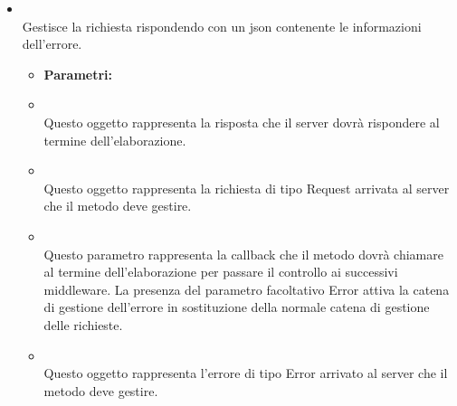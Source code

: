 \begin{itemize}
\item[] \textbf{} \\ Gestisce la richiesta rispondendo con un json contenente le informazioni dell'errore.
\begin{itemize}\addtolength{\itemsep}{-0.5\baselineskip}
\item[] \textbf{Parametri:}
\item[]  \\ Questo oggetto rappresenta la risposta che il server dovrà rispondere al termine dell'elaborazione.
\item[]  \\ Questo oggetto rappresenta la richiesta di tipo Request arrivata al server che il metodo deve gestire.
\item[]  \\ Questo parametro rappresenta la callback che il metodo dovrà chiamare al termine dell'elaborazione per passare il controllo ai successivi middleware. La presenza del parametro facoltativo Error attiva la catena di gestione dell'errore in sostituzione della normale catena di gestione delle richieste.
\item[]  \\ Questo oggetto rappresenta l'errore di tipo Error arrivato al server che il metodo deve gestire.
\end{itemize}
\end{itemize}

